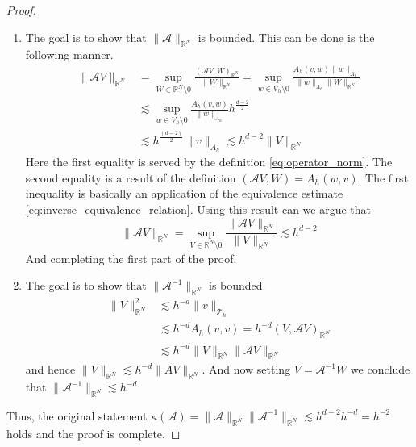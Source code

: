 \begin{proof}
    \begin{enumerate}[label=\arabic*)]
        \item  The goal is to show that $\| \mathcal{A}  \|_{ \mathbb{R} ^{N} }^{  } $ is bounded. This can be done is the following manner.
    \[
        \begin{split}
            \| \mathcal{A} V \|_{ \mathbb{R} ^{N} }^{  } &= \sup_{W \in \mathbb{R} ^{N} \setminus 0} \frac{( \mathcal{A} V, W) _{\mathbb{R} ^{N}}}{\| W \|_{ \mathbb{R} ^{N} }^{  } } = \sup_{w \in  V_{h} \setminus 0} \frac{A_{h} ( v,w) \| w \|_{ A_{h} }^{  } }{\| w \|_{ A_{h}  }^{  } \| W \|_{\mathbb{R} ^{N}  }^{  }  } \\
                                                         &\lesssim \sup_{w \in  V_{h} \setminus 0} \frac{A_{h} ( v,w) }{\| w \|_{ A_{h}  }^{  }} h^{\frac{d-2}{2} }   \\
    &\lesssim h^{\frac{( d-2) }{2}  } \| v \|_{ A_{h}  }^{  } \lesssim h^{d-2} \| V \|_{ \mathbb{R} ^{N} }^{  }
        \end{split}
    \]
Here the first equality is served by the definition \eqref{eq:operator_norm}.
The second equality is a result of the definition $( \mathcal{A} V,W) = A_{h}(w,v)$.
The first inequality is basically an application of the equivalence estimate \eqref{eq:inverse_equivalence_relation}.
Using this result can we argue that \[
    \| \mathcal{A} V \|_{ \mathbb{R} ^{N}} = \sup_{V \in \mathbb{R} ^{N} \setminus 0} \frac{\| \mathcal{A} V \|_{ \mathbb{R} ^{N} }^{  } }{\| V \|_{ \mathbb{R} ^{N} }^{  } } \lesssim h^{d-2}
\]
And completing the first part of the proof.
\item The goal is to show that $\| \mathcal{A} ^{-1} \|_{ \mathbb{R} ^{N} }^{  } $  is bounded.
    \[
    \begin{split}
          \| V \|_{ \mathbb{R} ^{N} }^{ 2 } & \lesssim h^{-d} \| v \|_{ \mathcal{T}_{h}  }^{  }  \\
          & \lesssim  h^{-d} A_{h}( v,v) =   h^{-d} ( V, \mathcal{A} V)_{\mathbb{R} ^{N}} \\
          &  \lesssim  h^{-d}  \| V \|_{ \mathbb{R} ^{N} }^{  } \| \mathcal{A} V \|_{ \mathbb{R} ^{N} }^{  }
    \end{split}
    \]
and hence $\| V \|_{\mathbb{R} ^{N}   }^{  } \lesssim h^{-d} \| AV \|_{\mathbb{R} ^{N}  }^{  }  $. And now setting $V= \mathcal{A} ^{-1} W$ we conclude that $\| \mathcal{A} ^{-1} \|_{ \mathbb{R} ^{N} }^{  } \lesssim h^{-d} $
    \end{enumerate}

    Thus, the original statement $\kappa ( \mathcal{A} )  = \| \mathcal{A}  \|_{ \mathbb{R} ^{N} }^{  } \| \mathcal{A}^{-1}  \|_{ \mathbb{R} ^{N} }^{  } \lesssim h^{d-2} h^{-d} = h^{-2}$ holds and the proof is complete.


\end{proof}



